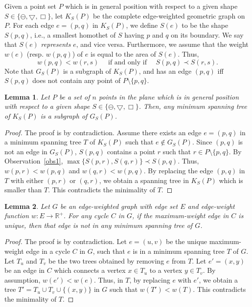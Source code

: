 \documentclass[11pt,a4paper]{article}
\newcommand{\G}[2]{G_{#1}({#2})}
\newcommand{\ddisc}{\ominus}
\newcommand{\sqr}{\Box}
\newcommand{\trid}{\bigtriangledown}
\newtheorem{lemma}{Lemma}
\begin{document}
Given a point set $P$ which is in general position with respect to a given shape $S\in\{\ddisc, \trid, \sqr\}$, let $K_S(P)$ be the complete edge-weighted geometric graph on $P$. For each edge $e=(p,q)$ in $K_S(P)$, we define $S(e)$ to be the shape $S(p,q)$, i.e., a smallest homothet of $S$ having $p$ and $q$ on its boundary. We say that $S(e)$ {\em represents} $e$, and vice versa. Furthermore, we assume that the weight $w(e)$ (resp. $w(p,q)$) of $e$ is equal to the area of $S(e)$. Thus,
$$w(p,q)<w(r,s) \quad\text{ if and only if }\quad S(p,q)\prec S(r,s).$$
Note that $\G{S}{P}$ is a subgraph of $K_S(P)$, and has an edge $(p,q)$ iff $S(p,q)$ does not contain any point of $P\setminus\{p,q\}$. 


\begin{lemma}
\label{mst-in-GS}
Let $P$ be a set of $n$ points in the plane which is in general position with respect to a given shape $S\in\{\ddisc, \trid, \sqr\}$. Then, any minimum spanning tree of $K_S(P)$ is a subgraph of $\G{S}{P}$. 
\end{lemma}
\begin{proof}
 The proof is by contradiction. Assume there exists an edge $e=(p,q)$ in a minimum spanning tree $T$ of $K_S(P)$ such that $e\notin \G{S}{P}$. Since $(p,q)$ is not an edge in $\G{S}{P}$, $S(p,q)$ contains a point $r$ such that $r\in P\setminus\{p,q\}$. By Observation~\ref{obs1}, $\max\{S(p,r),S(q,r)\}\prec S(p,q)$. Thus, $w(p,r)<w(p,q)$ and $w(q,r)<w(p,q)$. By replacing the edge $(p,q)$ in $T$ with either $(p,r)$ or $(q,r)$, we obtain a spanning tree in $K_S(P)$ which is smaller than $T$. This contradicts the minimality of $T$.
\end{proof}

\begin{lemma}
\label{cycle-lemma}
Let $G$ be an edge-weighted graph with edge set $E$ and edge-weight function $w:E\rightarrow\mathbb{R^+}$. For any cycle $C$ in $G$, if the maximum-weight edge in $C$ is unique, then that edge is not in any minimum spanning tree of $G$.
\end{lemma}

\begin{proof}
The proof is by contradiction. Let $e=(u,v)$ be the unique maximum-weight edge in a cycle $C$ in $G$, such that $e$ is in a minimum spanning tree $T$ of $G$. Let $T_u$ and $T_v$ be the two trees obtained by removing $e$ from $T$. Let $e'=(x,y)$ be an edge in $C$ which connects a vertex $x\in T_u$ to a vertex $y\in T_v$. By assumption, $w(e')< w(e)$. Thus, in $T$, by replacing $e$ with $e'$, we obtain a tree $T'=T_u\cup T_v \cup\{(x,y)\}$ in $G$ such that $w(T')<w(T)$. This contradicts the minimality of $T$. 
\end{proof}
\end{document}
